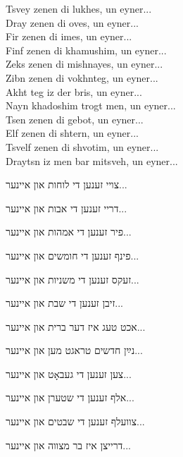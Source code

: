 \begin{minipage}[t]{0.52\linewidth}
\begin{english}
Tsvey zenen di lukhes, \hfill {\small un eyner...} \\
Dray zenen di oves, \hfill {\small un eyner...} \\
Fir zenen di imes, \hfill {\small un eyner...} \\
Finf zenen di khamushim, \hfill {\small un eyner...} \\
Zeks zenen di mishnayes, \hfill {\small un eyner...} \\
Zibn zenen di vokhnteg, \hfill {\small un eyner...} \\
Akht teg iz der bris, \hfill {\small un eyner...} \\
Nayn khadoshim trogt men, \hfill {\small un eyner...} \\
Tsen zenen di gebot, \hfill {\small un eyner...} \\
Elf zenen di shtern, \hfill {\small un eyner...}\\
Tsvelf zenen di shvotim, \hfill {\small un eyner...} \\
Draytsn iz men bar mitsveh, \hfill {\small un eyner...} \\
\end{english}
\end{minipage} \hspace{0.02\linewidth}
\begin{minipage}[t]{0.44\linewidth}
צויי זענען די לוחות
{\hfill \tiny
און איינער...
}

דריי זענען די אבות
{\hfill \tiny
און איינער...
}

פיר זענען די אמהות
{\hfill \tiny
און איינער...
}

פינף זענען די חומשים
{\hfill \tiny
און איינער...
}

זעקס זענען די משניות
{\hfill \tiny
און איינער...
}

זיבן זענען די שבת
{\hfill \tiny
און איינער...
}

אכט טעג איז דער ברית
{\hfill \tiny
און איינער...
}

נײַן חדשים טראגט מען
{\hfill \tiny
און איינער...
}

צען זענען די געבאָט
{\hfill \tiny
און איינער...
}

אלף זענען די שטערן
{\hfill \tiny
און איינער...
}

צוועלף זענען די שבטים
{\hfill \tiny
און איינער...
}

דרייצן איז בר מצווה
{\hfill \tiny
און איינער...
}
\end{minipage}

